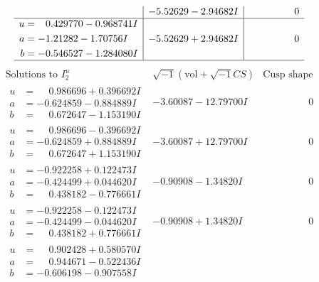 \documentclass[1p]{elsarticle_modified}
\theoremstyle{definition}
\newcommand{\I}{\sqrt{-1}}
\begin{document}
$$\begin{array}{c|c|c}
 & -5.52629 - 2.94682 I & \phantom{-0.000000 } 0 \\ \hline\begin{aligned}
u &= \phantom{-}0.429770 - 0.968741 I \\
a &= -1.21282 - 1.70756 I \\
b &= -0.546527 - 1.284080 I\end{aligned}
 & -5.52629 + 2.94682 I & \phantom{-0.000000 } 0\\
 \hline 
 \end{array}$$\newpage$$\begin{array}{c|c|c}  
\text{Solutions to }I^u_{2}& \I (\text{vol} + \sqrt{-1}CS) & \text{Cusp shape}\\
 \hline 
\begin{aligned}
u &= \phantom{-}0.986696 + 0.396692 I \\
a &= -0.624859 - 0.884889 I \\
b &= \phantom{-}0.672647 - 1.153190 I\end{aligned}
 & -3.60087 - 12.79700 I & \phantom{-0.000000 } 0 \\ \hline\begin{aligned}
u &= \phantom{-}0.986696 - 0.396692 I \\
a &= -0.624859 + 0.884889 I \\
b &= \phantom{-}0.672647 + 1.153190 I\end{aligned}
 & -3.60087 + 12.79700 I & \phantom{-0.000000 } 0 \\ \hline\begin{aligned}
u &= -0.922258 + 0.122473 I \\
a &= -0.424499 + 0.044620 I \\
b &= \phantom{-}0.438182 - 0.776661 I\end{aligned}
 & -0.90908 - 1.34820 I & \phantom{-0.000000 } 0 \\ \hline\begin{aligned}
u &= -0.922258 - 0.122473 I \\
a &= -0.424499 - 0.044620 I \\
b &= \phantom{-}0.438182 + 0.776661 I\end{aligned}
 & -0.90908 + 1.34820 I & \phantom{-0.000000 } 0 \\ \hline\begin{aligned}
u &= \phantom{-}0.902428 + 0.580570 I \\
a &= \phantom{-}0.944671 - 0.522436 I \\
b &= -0.606198 - 0.907558 I\end{aligned}

\end{array}$$
\end{document}
